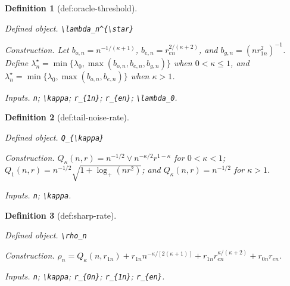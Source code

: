 \documentclass{article}
\newtheorem{definition}{Definition}
\begin{document}
\begin{definition}[def:oracle-threshold]\label{def:oracle-threshold}
\par\smallskip\noindent\emph{Defined object.} \texttt{\textbackslash{}\allowbreak{}lambda\_\allowbreak{}n\textasciicircum{}\{\textbackslash{}\allowbreak{}star\}\allowbreak{}}
\par\smallskip\noindent\emph{Construction.} Let \(b_{o,n}=n^{-1/(\kappa+1)}\), \(b_{e,n}=r_{en}^{2/(\kappa+2)}\), and \(b_{g,n}=(n r_{1n}^2)^{-1}\). Define \(\lambda_n^{\star}=\min\{\lambda_0,\max(b_{o,n},b_{e,n},b_{g,n})\}\) when \(0<\kappa\le1\), and \(\lambda_n^{\star}=\min\{\lambda_0,\max(b_{o,n},b_{e,n})\}\) when \(\kappa>1\).
\par\smallskip\noindent\emph{Inputs.} \texttt{n}; \texttt{\textbackslash{}\allowbreak{}kappa}; \texttt{r\_\allowbreak{}\{1n\}\allowbreak{}}; \texttt{r\_\allowbreak{}\{en\}\allowbreak{}}; \texttt{\textbackslash{}\allowbreak{}lambda\_\allowbreak{}0}.
\end{definition}

\begin{definition}[def:tail-noise-rate]\label{def:tail-noise-rate}
\par\smallskip\noindent\emph{Defined object.} \texttt{Q\_\allowbreak{}\{\textbackslash{}\allowbreak{}kappa\}\allowbreak{}}
\par\smallskip\noindent\emph{Construction.} \(Q_{\kappa}(n,r)=n^{-1/2}\vee n^{-\kappa/2}r^{1-\kappa}\) for \(0<\kappa<1\); \(Q_1(n,r)=n^{-1/2}\sqrt{1+\log_+(nr^2)}\); and \(Q_{\kappa}(n,r)=n^{-1/2}\) for \(\kappa>1\).
\par\smallskip\noindent\emph{Inputs.} \texttt{n}; \texttt{\textbackslash{}\allowbreak{}kappa}.
\end{definition}

\begin{definition}[def:sharp-rate]\label{def:sharp-rate}
\par\smallskip\noindent\emph{Defined object.} \texttt{\textbackslash{}\allowbreak{}rho\_\allowbreak{}n}
\par\smallskip\noindent\emph{Construction.} \(\rho_n=Q_{\kappa}(n,r_{1n})+r_{1n}n^{-\kappa/[2(\kappa+1)]}+r_{1n}r_{en}^{\kappa/(\kappa+2)}+r_{0n}r_{en}\).
\par\smallskip\noindent\emph{Inputs.} \texttt{n}; \texttt{\textbackslash{}\allowbreak{}kappa}; \texttt{r\_\allowbreak{}\{0n\}\allowbreak{}}; \texttt{r\_\allowbreak{}\{1n\}\allowbreak{}}; \texttt{r\_\allowbreak{}\{en\}\allowbreak{}}.
\end{definition}
\end{document}
